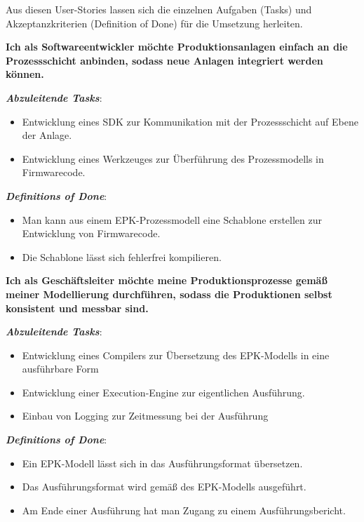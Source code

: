 \noindent Aus diesen User-Stories lassen sich die einzelnen Aufgaben (Tasks) und Akzeptanzkriterien (Definition of Done) für die Umsetzung herleiten.


\noindent \textbf{Ich als Softwareentwickler möchte Produktionsanlagen einfach an die Prozessschicht anbinden, sodass neue Anlagen integriert werden können.}

\textbf{\textit{Abzuleitende Tasks}}:

\begin{itemize}
    \item Entwicklung eines SDK zur Kommunikation mit der Prozessschicht auf Ebene der Anlage.
    \item Entwicklung eines Werkzeuges zur Überführung des Prozessmodells in Firmwarecode.
\end{itemize}

\textbf{\textit{Definitions of Done}}:

\begin{itemize}
    \item Man kann aus einem EPK-Prozessmodell eine Schablone erstellen zur Entwicklung von Firmwarecode.
    \item Die Schablone lässt sich fehlerfrei kompilieren.
\end{itemize}


\noindent \textbf{Ich als Geschäftsleiter möchte meine Produktionsprozesse gemäß meiner Modellierung durchführen, sodass die Produktionen selbst konsistent und messbar sind.}

\textbf{\textit{Abzuleitende Tasks}}:

\begin{itemize}
    \item Entwicklung eines Compilers zur Übersetzung des EPK-Modells in eine ausführbare Form
    \item Entwicklung einer Execution-Engine zur eigentlichen Ausführung.
    \item Einbau von Logging zur Zeitmessung bei der Ausführung
\end{itemize}

\textbf{\textit{Definitions of Done}}:

\begin{itemize}
    \item Ein EPK-Modell lässt sich in das Ausführungsformat übersetzen.
    \item Das Ausführungsformat wird gemäß des EPK-Modells ausgeführt.
    \item Am Ende einer Ausführung hat man Zugang zu einem Ausführungsbericht.
\end{itemize}

